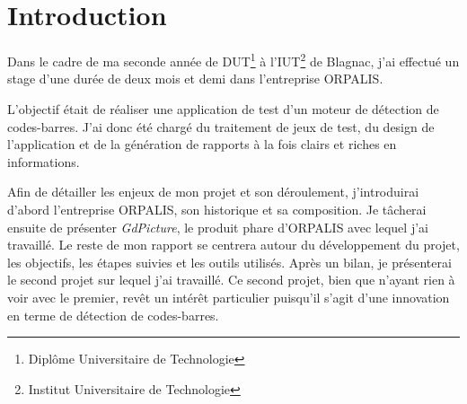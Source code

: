 \chapter*{Introduction}

Dans le cadre de ma seconde année de DUT\footnote{Diplôme Universitaire de Technologie} à l'IUT\footnote{Institut Universitaire de Technologie} de Blagnac, j'ai effectué un stage d'une durée de deux mois et demi dans l'entreprise ORPALIS.

L'objectif était de réaliser une application de test d'un moteur de détection de codes-barres. J'ai donc été chargé du traitement de jeux de test, du design de l'application et de la génération de rapports à la fois clairs et riches en informations.

Afin de détailler les enjeux de mon projet et son déroulement, j'introduirai d'abord l'entreprise ORPALIS, son historique et sa composition. Je tâcherai ensuite de présenter \emph{GdPicture}, le produit phare d'ORPALIS avec lequel j'ai travaillé. Le reste de mon rapport se centrera autour du développement du projet, les objectifs, les étapes suivies et les outils utilisés. Après un bilan, je présenterai le second projet sur lequel j'ai travaillé. Ce second projet, bien que n'ayant rien à voir avec le premier, revêt un intérêt particulier puisqu'il s'agit d'une innovation en terme de détection de codes-barres.